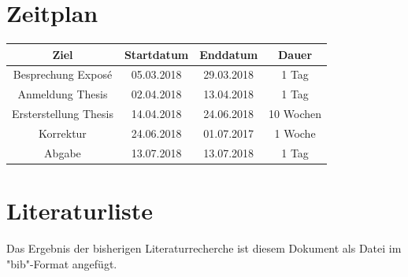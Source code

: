 \section{Zeitplan}
\begin{tabular}{|c|c|c|c|}
	\hline 
	Ziel & Startdatum & Enddatum & Dauer \\ 
	\hline 
	Besprechung Exposé & 05.03.2018 & 29.03.2018 & 1 Tag \\ 
	\hline 
	Anmeldung Thesis & 02.04.2018 & 13.04.2018 & 1 Tag \\ 
	\hline 
	Ersterstellung Thesis & 14.04.2018 & 24.06.2018 & 10 Wochen \\ 
	\hline 
	Korrektur & 24.06.2018 & 01.07.2017 & 1 Woche \\ 
	\hline 
	Abgabe & 13.07.2018 & 13.07.2018 & 1 Tag \\ 
	\hline 
\end{tabular} 

\section{Literaturliste}
Das Ergebnis der bisherigen Literaturrecherche ist diesem Dokument als Datei im "bib"-Format angefügt.